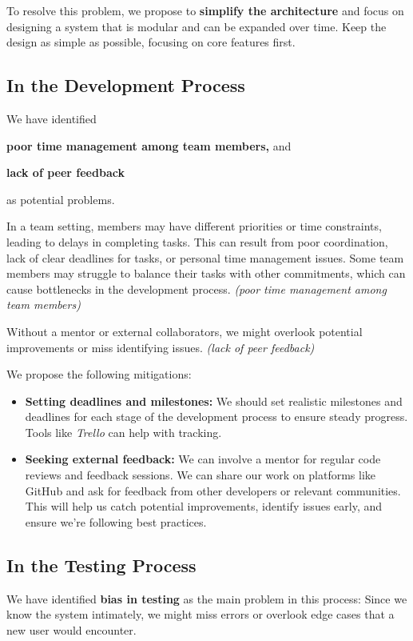 \documentclass[twoside,a4paper,journal]{IEEEtran}
\begin{document}
To resolve this problem, we propose to \textbf{simplify the architecture} and
focus on designing a system that is modular and can be expanded over time.
Keep the design as simple as possible, focusing on core features first.

\subsection{In the Development Process}
We have identified
\begin{enumerate*}
  \item \textbf{poor time management among team members,} and
  \item \textbf{lack of peer feedback}
\end{enumerate*}
as potential problems.

In a team setting, members may have different priorities or time constraints,
leading to delays in completing tasks.
This can result from poor coordination, lack of clear deadlines for tasks, or
personal time management issues.
Some team members may struggle to balance their tasks with other commitments,
which can cause bottlenecks in the development process.
\textit{(poor time management among team members)}

Without a mentor or external collaborators, we might overlook potential
improvements or miss identifying issues.
\textit{(lack of peer feedback)}

We propose the following mitigations:
\begin{itemize}
  \item \textbf{Setting deadlines and milestones:}
    We should set realistic milestones and deadlines for each stage of the
    development process to ensure steady progress.
    Tools like \textit{Trello} can help with tracking.
  \item \textbf{Seeking external feedback:}
    We can involve a mentor for regular code reviews and feedback sessions.
    We can share our work on platforms like GitHub and ask for feedback from
    other developers or relevant communities.
    This will help us catch potential improvements, identify issues early, and
    ensure we're following best practices.
\end{itemize}

\subsection{In the Testing Process}
We have identified \textbf{bias in testing} as the main problem in this
process:
Since we know the system intimately, we might miss errors or overlook edge cases
that a new user would encounter.
\end{document}
